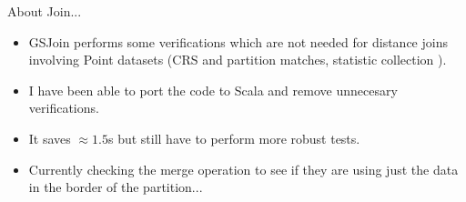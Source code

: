 \documentclass{beamer}
\begin{document}
\begin{frame}{About Join...}
    \begin{itemize}
        \item GSJoin performs some verifications which are not needed for distance joins involving Point datasets (CRS and partition matches, statistic collection ).
        \item I have been able to port the code to Scala and remove unnecesary verifications.  
        \item It saves $\approx1.5$s but still have to perform more robust tests.
        \item Currently checking the merge operation to see if they are using just the data in the border of the partition...
    \end{itemize}
\end{frame}
\end{document}
